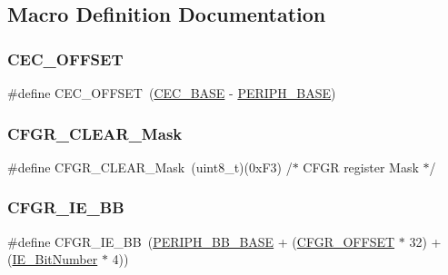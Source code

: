\subsection{Macro Definition Documentation}
\mbox{\label{group___c_e_c___private___defines_ga675324bd8967b75f32554f50210821af}} 
\subsubsection{\texorpdfstring{CEC\_OFFSET}{CEC\_OFFSET}}
{\footnotesize\ttfamily \#define C\+E\+C\+\_\+\+O\+F\+F\+S\+ET~(\mbox{\hyperlink{group___peripheral__memory__map_gaacb77bc44b3f8c87ab98f241e760e440}{C\+E\+C\+\_\+\+B\+A\+SE}} -\/ \mbox{\hyperlink{group___peripheral__memory__map_ga9171f49478fa86d932f89e78e73b88b0}{P\+E\+R\+I\+P\+H\+\_\+\+B\+A\+SE}})}

\mbox{\label{group___c_e_c___private___defines_gaaedf9b8df17534f5eaf75ec1ca3fbd7a}} 
\subsubsection{\texorpdfstring{CFGR\_CLEAR\_Mask}{CFGR\_CLEAR\_Mask}}
{\footnotesize\ttfamily \#define C\+F\+G\+R\+\_\+\+C\+L\+E\+A\+R\+\_\+\+Mask~(uint8\+\_\+t)(0x\+F3)        /$\ast$ C\+F\+G\+R register Mask $\ast$/}

\mbox{\label{group___c_e_c___private___defines_gac7fe35cf912353ca51a56c5f1f25b2fb}} 
\subsubsection{\texorpdfstring{CFGR\_IE\_BB}{CFGR\_IE\_BB}}
{\footnotesize\ttfamily \#define C\+F\+G\+R\+\_\+\+I\+E\+\_\+\+BB~(\mbox{\hyperlink{group___peripheral__memory__map_gaed7efc100877000845c236ccdc9e144a}{P\+E\+R\+I\+P\+H\+\_\+\+B\+B\+\_\+\+B\+A\+SE}} + (\mbox{\hyperlink{group___r_c_c___private___defines_ga8682298330c3b9bae1992e4f1a0af985}{C\+F\+G\+R\+\_\+\+O\+F\+F\+S\+ET}} $\ast$ 32) + (\mbox{\hyperlink{group___c_e_c___private___defines_ga57731312db52f3498312a56e98166fad}{I\+E\+\_\+\+Bit\+Number}} $\ast$ 4))}

